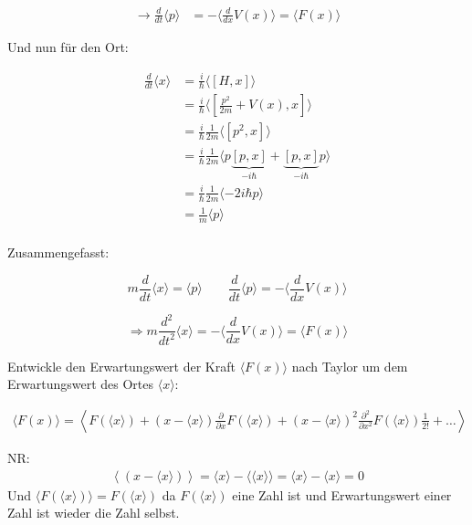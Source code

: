 \begin{align}
\rightarrow \frac{d}{dt} \langle p \rangle  &=  -\langle  \frac{d}{dx}  V(x) \rangle = \langle F(x) \rangle  
\end{align}

Und nun für den Ort:

\begin{align}
 \frac{d}{dt} \langle x \rangle  &= \frac{i}{\hbar} \langle [H,x]\rangle \\
&= \frac{i}{\hbar} \langle [\frac{p^2}{2m}+V(x),x]\rangle   \\
&= \frac{i}{\hbar}\frac{1}{2m} \langle [p^2,x]\rangle   \\
&= \frac{i}{\hbar}\frac{1}{2m} \langle p\underbrace{ [p,x]}_{-i\hbar}+\underbrace{ [p,x]}_{-i\hbar}p\rangle   \\
&= \frac{i}{\hbar}\frac{1}{2m} \langle -2i\hbar p\rangle   \\
&= \frac{1}{m} \langle p \rangle   \\
\end{align}

Zusammengefasst:

\[ m \frac{d}{dt} \langle x \rangle  = \langle p \rangle \qquad \frac{d}{dt} \langle p \rangle  =  -\langle  \frac{d}{dx}  V(x) \rangle \]


\begin{equation} 
\label{eq:42}
\Rightarrow m \frac{d^2}{dt^2} \langle x \rangle  =  -\langle  \frac{d}{dx}  V(x) \rangle =  \langle F(x) \rangle 
\end{equation}

Entwickle den Erwartungswert der Kraft \(\langle F(x)\rangle \) nach Taylor um dem Erwartungswert des Ortes \(\langle x\rangle \):

\begin{align}
 \langle F(x) \rangle = \left\langle  F(\langle x\rangle ) + (x-\langle x\rangle) \frac{\partial }{\partial x} F(\langle x\rangle )+(x-\langle x\rangle)^2 \frac{\partial^2 }{\partial x^2} F(\langle x\rangle )\frac{1}{2!}+\dots \right\rangle 
\end{align}


NR: 
\begin{align}
\left\langle(x-\langle x\rangle) \right\rangle = \langle x\rangle -\langle \langle x\rangle \rangle  = \langle x\rangle -\langle x\rangle  = 0
\end{align}
Und \( \langle F(\langle x \rangle )\rangle  = F(\langle x \rangle )  \) da \(F(\langle x\rangle )\) eine Zahl ist und Erwartungswert einer Zahl ist wieder die Zahl selbst.

